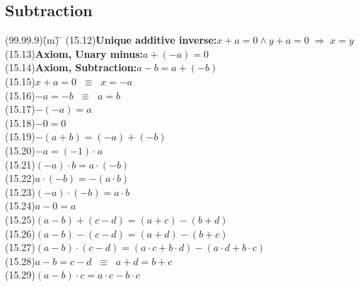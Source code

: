 \documentclass{amsart}
\newcommand{\lgap}{2pt}                             %
\newcommand{\equivss}{\ensuremath{\;\;\equiv\;\;}}  %
\newcommand{\impl}{\ensuremath{\Rightarrow}}        %
\begin{document}
\subsection*{Subtraction}
\begin{tabbing}
(99.99.9)\;\=(m)\;\= \makebox[2in]{ } \= \kill
(15.12)\>\textbf{Unique additive inverse:}\quad $x + a = 0 \land y + a = 0 \;\impl\; x = y$\\[\lgap]
(15.13)\>\textbf{Axiom, Unary minus:}\quad $a + (-a) = 0$\\[\lgap]
(15.14)\>\textbf{Axiom, Subtraction:}\quad $a - b = a + (-b)$\\[\lgap]
(15.15)\>$x + a = 0 \equivss x = -a$\\[\lgap]
(15.16)\>$-a = -b \equivss a = b$\\[\lgap]
(15.17)\>$-(-a) = a$\\[\lgap]
(15.18)\>$-0 = 0$\\[\lgap]
(15.19)\>$-(a + b) = (-a) + (-b)$\\[\lgap]
(15.20)\>$-a = (-1) \cdot a$\\[\lgap]
(15.21)\>$(-a) \cdot b = a \cdot (-b)$\\[\lgap]
(15.22)\>$a \cdot (-b) = -(a \cdot b)$\\[\lgap]
(15.23)\>$(-a) \cdot (-b) = a \cdot b$\\[\lgap]
(15.24)\>$a - 0 = a$\\[\lgap]
(15.25)\>$(a - b) + (c - d) = (a + c) - (b + d)$\\[\lgap]
(15.26)\>$(a - b) - (c - d) = (a + d) - (b + c)$\\[\lgap]
(15.27)\>$(a - b) \cdot (c - d) = (a \cdot c + b \cdot d) - (a \cdot d + b \cdot c)$\\[\lgap]
(15.28)\>$a - b = c - d \equivss a + d = b + c$\\[\lgap]
(15.29)\>$(a - b) \cdot c = a \cdot c - b \cdot c$\\[\lgap]
\end{tabbing}
\end{document}
